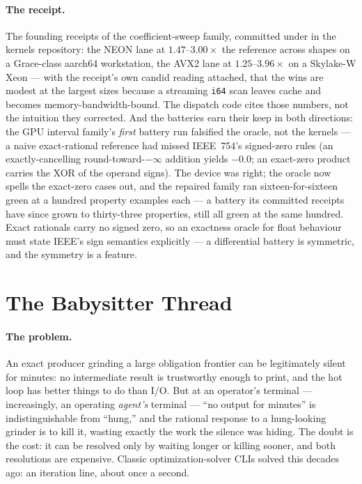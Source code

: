 \paragraph{The receipt.} The founding receipts of the
coefficient-sweep family, committed under  in the
kernels repository: the NEON lane at $1.47$--$3.00\times$ the
reference across shapes on a Grace-class aarch64 workstation, the AVX2
lane at $1.25$--$3.96\times$ on a Skylake-W Xeon --- with the
receipt's own candid reading attached, that the wins are modest at the
largest sizes because a streaming \texttt{i64} scan leaves cache and
becomes memory-bandwidth-bound. The dispatch code cites those numbers,
not the intuition they corrected. And the batteries earn their keep in
both directions: the GPU interval family's \emph{first} battery run
falsified the oracle, not the kernels --- a naive exact-rational
reference had missed IEEE~754's signed-zero rules \cite{ieee754} (an
exactly-cancelling round-toward-$-\infty$ addition yields $-0.0$; an
exact-zero product carries the XOR of the operand signs). The device
was right; the oracle now spells the exact-zero cases out, and the
repaired family ran sixteen-for-sixteen green at a hundred property
examples each --- a battery its committed receipts have since grown
to thirty-three properties, still all green at the same hundred. Exact rationals carry no signed zero, so an exactness oracle for
float behaviour must state IEEE's sign semantics explicitly --- a
differential battery is symmetric, and the symmetry is a feature.

\section{The Babysitter Thread}
\label{sec:pearl-babysitter}

\paragraph{The problem.} An exact producer grinding a large obligation
frontier can be legitimately silent for minutes: no intermediate
result is trustworthy enough to print, and the hot loop has better
things to do than I/O. But at an operator's terminal ---
increasingly, an operating \emph{agent's} terminal --- ``no output for
minutes'' is indistinguishable from ``hung,'' and the rational
response to a hung-looking grinder is to kill it, wasting exactly the
work the silence was hiding. The doubt is the cost: it can be resolved
only by waiting longer or killing sooner, and both resolutions are
expensive. Classic optimization-solver CLIs solved this decades ago:
an iteration line, about once a second.

